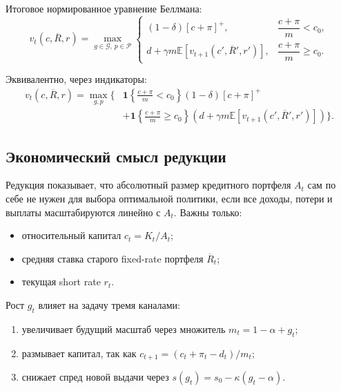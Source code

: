 \documentclass[11pt,a4paper]{article}
\newcommand{\1}{\mathbf{1}}
\newcommand{\E}{\mathbb{E}}
\newcommand{\pos}[1]{\left[#1\right]^+}
\begin{document}
Итоговое нормированное уравнение Беллмана:
\begin{equation}
\boxed{
    v_t(c,\overline{R},r)
    =
    \max_{g\in\mathcal{G},\,p\in\mathcal{P}}
    \begin{cases}
        (1-\delta)\pos{c+\pi},
        & \dfrac{c+\pi}{m}<c_0,\\[8pt]
        d+\gamma m\E\left[v_{t+1}(c',\overline{R}',r')\right],
        & \dfrac{c+\pi}{m}\ge c_0.
    \end{cases}
}
\end{equation}

Эквивалентно, через индикаторы:
\begin{equation}
\boxed{
\begin{aligned}
    v_t(c,\overline{R},r)
    =
    \max_{g,p}\Bigg\{&
    \1\left\{\frac{c+\pi}{m}<c_0\right\}(1-\delta)\pos{c+\pi}
    \\
    &+
    \1\left\{\frac{c+\pi}{m}\ge c_0\right\}
    \left(d+\gamma m\E\left[v_{t+1}(c',\overline{R}',r')\right]\right)
    \Bigg\}.
\end{aligned}
}
\end{equation}

\subsection{Экономический смысл редукции}

Редукция показывает, что абсолютный размер кредитного портфеля $A_t$ сам по себе не нужен для выбора оптимальной политики, если все доходы, потери и выплаты масштабируются линейно с $A_t$. Важны только:
\begin{itemize}[noitemsep]
    \item относительный капитал $c_t=K_t/A_t$;
    \item средняя ставка старого fixed-rate портфеля $\overline{R}_t$;
    \item текущая short rate $r_t$.
\end{itemize}

Рост $g_t$ влияет на задачу тремя каналами:
\begin{enumerate}[noitemsep]
    \item увеличивает будущий масштаб через множитель $m_t=1-\alpha+g_t$;
    \item размывает капитал, так как $c_{t+1}=(c_t+\pi_t-d_t)/m_t$;
    \item снижает спред новой выдачи через $s(g_t)=s_0-\kappa(g_t-\alpha)$.
\end{enumerate}
\end{document}
